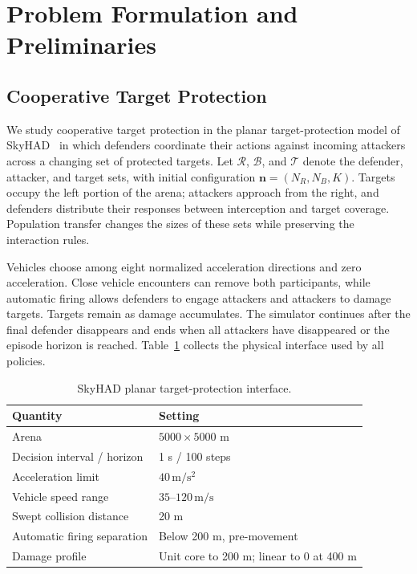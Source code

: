 \section{Problem Formulation and Preliminaries}
\label{sec:problem}
\subsection{Cooperative Target Protection}
We study cooperative target protection in the planar target-protection model of SkyHAD~\cite{skyhad2026} in which defenders coordinate their actions against incoming attackers across a changing set of protected targets. Let $\mathcal R$, $\mathcal B$, and $\mathcal T$ denote the defender, attacker, and target sets, with initial configuration $\mathbf n=(N_R,N_B,K)$. Targets occupy the left portion of the arena; attackers approach from the right, and defenders distribute their responses between interception and target coverage. Population transfer changes the sizes of these sets while preserving the interaction rules.

Vehicles choose among eight normalized acceleration directions and zero acceleration. Close vehicle encounters can remove both participants, while automatic firing allows defenders to engage attackers and attackers to damage targets. Targets remain as damage accumulates. The simulator continues after the final defender disappears and ends when all attackers have disappeared or the episode horizon is reached. Table~\ref{tab:environment} collects the physical interface used by all policies.

\begin{table}[t]
\centering\footnotesize
\caption{SkyHAD planar target-protection interface.}
\label{tab:environment}
\begin{tabular}{@{}ll@{}}\toprule
Quantity & Setting\\\midrule
Arena & $5000\times5000$ m\\
Decision interval / horizon & 1 s / 100 steps\\
Acceleration limit & $40\,\mathrm{m/s^2}$\\
Vehicle speed range & $35$--$120\,\mathrm{m/s}$\\
Swept collision distance & 20 m\\
Automatic firing separation & Below 200 m, pre-movement\\
Damage profile & Unit core to 200 m; linear to 0 at 400 m\\
\bottomrule\end{tabular}
\end{table}

